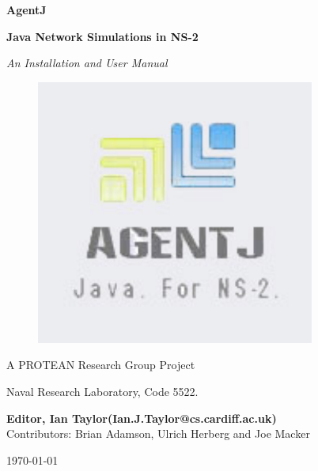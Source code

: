 \documentclass[12pt,a4paper]{book}
\makeatletter
\newcommand{\agentj}{AgentJ}
\def\titlename    {Java Network Simulations in NS-2}
\def\authorforinfo {Ian Taylor}
\def\autemail     {Ian.J.Taylor@cs.cardiff.ac.uk}
\def\subjectname  {An Installation and User Manual}
\def\location     {Naval Research Laboratory, Code 5522.}
\makeatother
\begin{document}
\pagestyle{empty}

\begin{center}

\LARGE


\textbf{\agentj} 

\vspace{0.1in}
\textbf{\titlename}
\vspace{0.3in}

\emph{\subjectname}

\vspace{1.0in}

\begin{figure}[htbp]
\begin{center}
\includegraphics[scale=1.0]{images/agentj}
\end{center}
\end{figure}


\vspace{2.0cm}
A PROTEAN Research Group Project

\vspace{0.5cm}
\location


\vspace{1.0in}
\large
\textbf{Editor, \authorforinfo (\autemail)}\\
Contributors: Brian Adamson, Ulrich Herberg and Joe Macker


\vspace{0.3in}

\Large
\today

\end{center}

\normalsize
\frontmatter

\tableofcontents

\mainmatter






\footnotesize




\printindex

\end{document}
